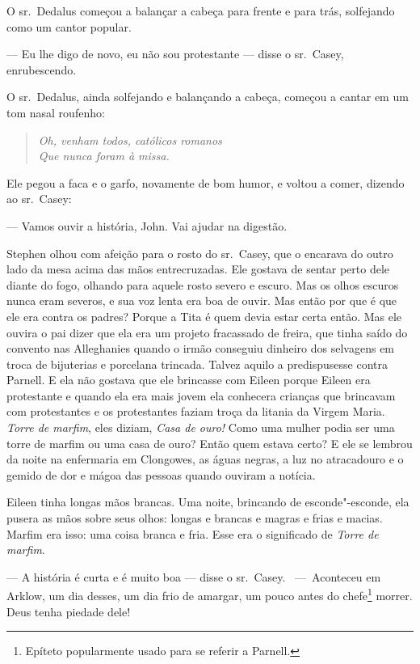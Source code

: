 O sr.~Dedalus começou a balançar a cabeça para frente e para trás,
solfejando como um cantor popular.

 --- Eu lhe digo de novo, eu não sou protestante --- disse o sr.~Casey, enrubescendo.

O sr.~Dedalus, ainda solfejando e balançando a cabeça, começou a cantar
em um tom nasal roufenho:

\begin{verse}\itshape
Oh, venham todos, católicos romanos\\  
Que nunca foram à missa.
\end{verse}


Ele pegou a faca e o garfo, novamente de bom humor, e voltou a comer,
dizendo ao sr.~Casey:

 --- Vamos ouvir a história, John. Vai ajudar na digestão.

Stephen olhou com afeição para o rosto do sr.~Casey, que o encarava do
outro lado da mesa acima das mãos entrecruzadas. Ele gostava de sentar
perto dele diante do fogo, olhando para aquele rosto severo e escuro.
Mas os olhos escuros nunca eram severos, e sua voz lenta era boa de
ouvir. Mas então por que é que ele era contra os padres? Porque a Tita
é quem devia estar certa então. Mas ele ouvira o pai dizer que ela era
um projeto fracassado de freira, que tinha saído do convento nas
Alleghanies quando o irmão conseguiu dinheiro dos selvagens em troca de
bijuterias e porcelana trincada. Talvez aquilo a predispusesse contra
Parnell. E ela não gostava que ele brincasse com Eileen porque Eileen
era protestante e quando ela era mais jovem ela conhecera crianças que
brincavam com protestantes e os protestantes faziam troça da litania da
Virgem Maria. \textit{Torre de marfim}, eles diziam, \textit{Casa de
ouro!} Como uma mulher podia ser uma torre de marfim ou uma casa de
ouro? Então quem estava certo? E ele se lembrou da noite na enfermaria
em Clongowes, as águas negras, a luz no atracadouro e o gemido de dor e
mágoa das pessoas quando ouviram a notícia.

Eileen tinha longas mãos brancas. Uma noite, brincando de esconde"-esconde,
ela pusera as mãos sobre seus olhos: longas e brancas e magras e frias
e macias. Marfim era isso: uma coisa branca e fria. Esse era o
significado de \textit{Torre de marfim}.

 --- A história é curta e é muito boa --- disse o sr.~Casey. \mbox{ --- Aconteceu} em Arklow, um dia desses, um dia frio de amargar, um pouco antes do
chefe\footnote{ Epíteto popularmente usado para se referir a Parnell.}
morrer. Deus tenha piedade dele!

